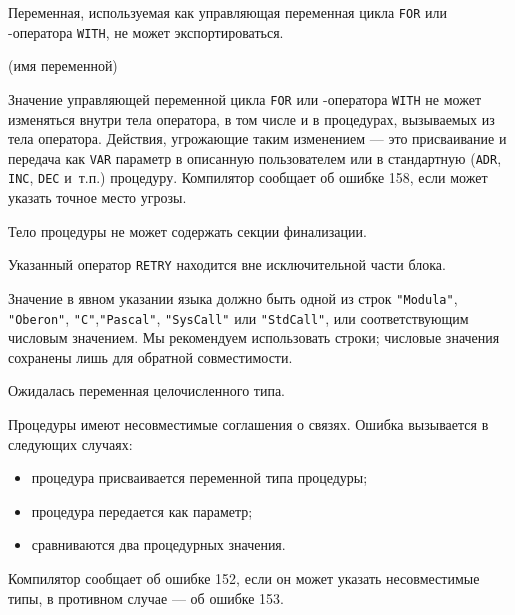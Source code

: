 Переменная, используемая как управляющая переменная цикла \verb'FOR' или 
\ot{}-оператора \verb'WITH', не может экспортироваться.


(имя переменной)

Значение управляющей переменной цикла \verb'FOR' или 
\ot{}-оператора \verb'WITH'
не может изменяться внутри тела оператора, в том числе и в процедурах,
вызываемых из тела оператора. 
Действия, угрожающие таким изменением --- это присваивание и передача как
\verb'VAR' параметр в описанную пользователем или в стандартную
(\verb'ADR', \verb'INC', \verb'DEC' и~т.п.) процедуру.
Компилятор сообщает об ошибке 158, если может указать 
точное место угрозы.


Тело процедуры не может содержать секции финализации.


Указанный оператор \verb'RETRY' находится вне исключительной части блока.


Значение в явном указании языка должно быть одной из строк
\verb'"Modula"', \verb'"Oberon"',
\verb'"C"',\verb'"Pascal"', \verb'"SysCall"' или \verb'"StdCall"',
или соответствующим числовым значением. Мы рекомендуем использовать строки;
числовые значения сохранены лишь для обратной совместимости.


Ожидалась переменная целочисленного типа.


Процедуры имеют несовместимые соглашения о связях. Ошибка вызывается в 
следующих случаях:
\begin{itemize}
\item процедура присваивается переменной типа процедуры;
\item процедура передается как параметр;
\item сравниваются два процедурных значения.
\end{itemize}
Компилятор сообщает об ошибке 152, если он может указать несовместимые типы,
в противном случае --- об ошибке 153.

